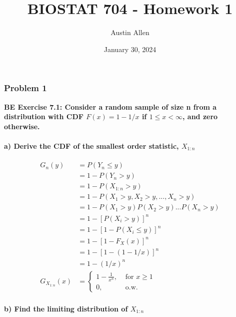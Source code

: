 \documentclass[
]{article}
\title{BIOSTAT 704 - Homework 1}
\author{Austin Allen}
\date{January 30, 2024}
\begin{document}
\maketitle

\hypertarget{problem-1}{%
\subsubsection{Problem 1}\label{problem-1}}

\textbf{BE Exercise 7.1: Consider a random sample of size n from a
distribution with CDF \(F(x) = 1 - 1/x\) if \(1 \le x < \infty\), and
zero otherwise.}

\hypertarget{a-derive-the-cdf-of-the-smallest-order-statistic-x_1n}{%
\paragraph{\texorpdfstring{a) Derive the CDF of the smallest order
statistic,
\(X_{1:n}\)}{a) Derive the CDF of the smallest order statistic, X\_\{1:n\}}}\label{a-derive-the-cdf-of-the-smallest-order-statistic-x_1n}}

\begin{align*}
G_n(y) &= P(Y_n \le y)\\
&= 1 - P(Y_n > y)\\
&= 1 - P(X_{1:n} > y)\\
&= 1 - P(X_1 > y, X_2 > y,...,X_n > y)\\
&= 1 - P(X_1 > y)P(X_2 > y)...P(X_n > y)\\
&= 1 - [P(X_i > y)]^n\\
&= 1 - [1 - P(X_i \le y)]^n\\
&= 1 - [1 - F_{X}(x)]^n\\
&= 1 - [1 - (1 - 1/x)]^n\\
&= 1 - (1/x)^n\\
G_{X_{1:n}}(x) &= 
\begin{cases}
  1 - \frac{1}{x^n}, &\text{ for } x \ge 1\\
  0, &\text{ o.w.}
\end{cases}
\end{align*}

\hypertarget{b-find-the-limiting-distribution-of-x_1n}{%
\paragraph{\texorpdfstring{b) Find the limiting distribution of
\(X_{1:n}\)}{b) Find the limiting distribution of X\_\{1:n\}}}\label{b-find-the-limiting-distribution-of-x_1n}}
\end{document}
